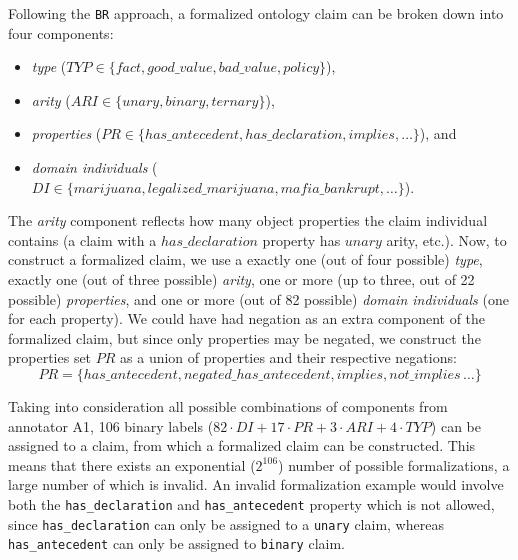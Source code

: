 Following the \texttt{BR} approach, a formalized ontology claim can be broken
down into four components:
\begin{itemize}
	\item \emph{type} ($\mathit{TYP} \in \{\mathit{fact},
		\mathit{good\_value}, \mathit{bad\_value}, \mathit{policy}\}$), 
	\item \emph{arity} ($\mathit{ARI} \in \{\mathit{unary},
		\mathit{binary},  \mathit{ternary}\}$),
	\item \emph{properties} ($\mathit{PR} \in \{\mathit{has\_antecedent},
		\mathit{has\_declaration}, \mathit{implies}, \dots\}$), and
	\item \emph{domain individuals} ($\mathit{DI} \in \{\mathit{marijuana},
		\mathit{legalized\_marijuana}, \mathit{mafia\_bankrupt},
		\dots\}$).
\end{itemize}
The \emph{arity} component reflects how many object properties the claim individual
contains (a claim with a $\mathit{has\_declaration}$ property has $\mathit{unary}$ arity, etc.).
Now, to construct a formalized claim, we use a exactly one (out of four
possible) \emph{type}, exactly one (out of three possible) \emph{arity},
one or more (up to three, out of 22 possible) \emph{properties}, and one
or more (out of 82 possible) \emph{domain individuals} (one for each property). 
We could have had negation as an extra component of the formalized claim, but
since only properties may be negated, we construct the properties set $PR$ as a
union of properties and their respective negations: 
$$
PR = \{\mathit{has\_antecedent}, 
\mathit{negated\_has\_antecedent}, \mathit{implies}, \mathit{not\_implies}\, \dots\}
$$

Taking into consideration all possible combinations of components from
annotator A1, 106 binary labels ($82 \cdot \mathit{DI} + 17 \cdot \mathit{PR} + 3 \cdot
\mathit{ARI} + 4 \cdot \mathit{TYP}$) can be assigned to a claim, from which a
formalized claim can be constructed.  This means that there  exists an
exponential ($2^{106}$) number of possible formalizations, a large number of
which is invalid.  An invalid formalization example would involve both the
\texttt{has\_declaration} and \texttt{has\_antecedent} property which is not allowed,
since \texttt{has\_declaration} can only be assigned to a \texttt{unary} claim,
whereas \texttt{has\_antecedent} can only be assigned to \texttt{binary} claim. 

